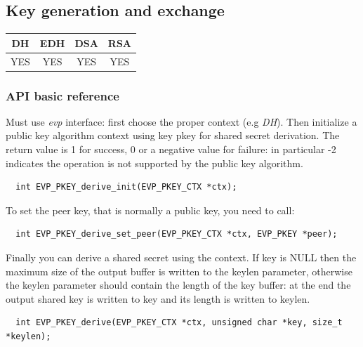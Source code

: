 \begin{center}
\end{center}

\newpage
\subsection{Key generation and exchange}
\begin{table}[!ht]
	\begin{tabular}{|| c | c | c | c ||}
		\textbf{DH} & \textbf{EDH} & \textbf{DSA} & \textbf{RSA} \\
		\hline \hline
		YES & YES & YES & YES \\
	\end{tabular}
\end{table}

\subsubsection*{API basic reference}
Must use \textit{evp} interface: first choose the proper context (e.g \textit{DH}). Then initialize a public key algorithm context using key pkey for shared secret derivation. The return value is 1 for success, 0 or a negative value for failure: in particular -2 indicates the operation is not supported by the public key algorithm.
\begin{verbatim}
  int EVP_PKEY_derive_init(EVP_PKEY_CTX *ctx);
\end{verbatim}
To set the peer key, that is normally a public key, you need to call:
\begin{verbatim}
  int EVP_PKEY_derive_set_peer(EVP_PKEY_CTX *ctx, EVP_PKEY *peer);
\end{verbatim} 
Finally you can derive a shared secret using the context. If key is NULL then the maximum size of the output buffer is written to the keylen parameter, otherwise the keylen parameter should contain the length of the key buffer: at the end the output shared key is written to key and its length is written to keylen.
\begin{verbatim}
  int EVP_PKEY_derive(EVP_PKEY_CTX *ctx, unsigned char *key, size_t *keylen);
\end{verbatim} 
